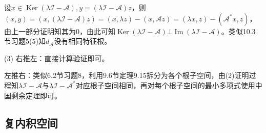 \documentclass[a4paper,UTF8,fontset=windows]{ctexart}
\DeclareMathOperator{\im}{Im}
\DeclareMathOperator{\Ker}{Ker}
\begin{document}
\begin{enumerate}
设$x\in\Ker(\lambda\mathcal{I}-\mathcal{A}),y=(\lambda\mathcal{I}-\mathcal{A})z$，则$(x,y)=(x,(\lambda\mathcal{I}-\mathcal{A})z)=(x,\lambda z)-(x,\mathcal{A}z)=(\lambda x,z)-(\mathcal{A}^*x,z)$，由上一部分证明知其为0，由此可知$\Ker(\lambda\mathcal{I}-\mathcal{A})\bot\im(\lambda\mathcal{I}-\mathcal{A})$。类似10.3节习题5(5)知$d_\mathcal{A}$没有相同特征根。

(3) 右推左：直接计算验证即可。

左推右：类似6.2节习题8，利用9.6节定理9.15拆分为各个根子空间，由(2)证明过程知$\lambda\mathcal{I}-\mathcal{A}$与$\lambda\mathcal{I}-\mathcal{A}^*$对应根子空间相同，再对每个根子空间的最小多项式使用中国剩余定理即可。
\end{enumerate}

\subsection{复内积空间}
\end{document}
